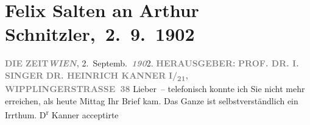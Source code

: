

         
         \renewcommand{\erwaehntePersonen}{Personen: Heinrich Kanner, Isidor Singer}
         \renewcommand{\erwaehnteInstitutionen}{Institutionen: Die Zeit}
         \renewcommand{\erwaehnteOrte}{Orte: Leoben, Niederösterreich, Steiermark, Wien, Wipplingerstraße}
         \renewcommand{\erwaehnteWerke}{Werke: Die Zeit, Die griechische Tänzerin. Novellette}
               \section[ Felix Salten an Arthur Schnitzler, 2. 9. 1902]{ Felix Salten an Arthur Schnitzler, 2. 9. 1902}\nopagebreak{}\rehead{ }\begin{ledgroupsized}[t]{13cm}\normalsize\beginnumbering \toendnotes[C]{\smallbreak\pagebreak[2]} 
\toendnotes[C]{\smallbreak}\pstart
           \noindent{}{\pb}\textcolor{gray}{\textbf{DIE}}\pend
           \pstart
           \textcolor{gray}{\textbf{ZEIT}}\hfill \textcolor{gray}{\textbf{\emph{WIEN},}}{ }2. Septemb. \textcolor{gray}{\textbf{\emph{190}}}2.\pend
           \pstart
           \textcolor{gray}{\textbf{\textsc{\textbf{}}}}\pend
           \pstart
           \textcolor{gray}{\textbf{HERAUSGEBER:}}\pend
           \pstart
           \textcolor{gray}{\textbf{\textbf{PROF. DR. I. SINGER}}}\pend
           \pstart
           \textcolor{gray}{\textbf{\textbf{DR. HEINRICH KANNER}}}\pend
           \pstart
           \textcolor{gray}{\textbf{\textbf{}}}\pend
           \pstart
           \textcolor{gray}{\textbf{I/\textsubscript{21},
                           WIPPLINGERSTRASSE 38}}\pend
           \pstart
           Lieber – telefonisch konnte ich Sie nicht mehr erreichen, als heute{ }Mittag Ihr Brief kam. Das Ganze ist selbstverständlich ein Irrthum. D\textsuperscript{r}{ }Kanner acceptirte \label{K_L03333-1v}
\end{ledgroupsized}
